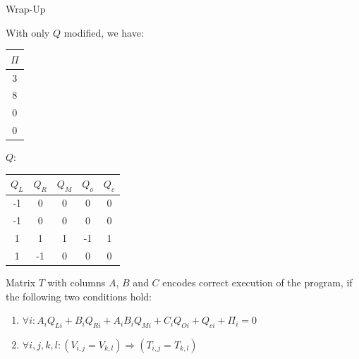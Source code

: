 \documentclass{zkdl-presentation-template}
\begin{document}
    \begin{frame}{Wrap-Up}
        \begin{example}
            With only $Q$ modified, we have:
            \centering 
            \begin{center}
                \begin{tabular}{|c|}
                    \hline
                    $\Pi$ \\ 
                    \hline
                    3 \\ 
                    \hline
                    8 \\ 
                    \hline
                    0 \\ 
                    \hline
                    0 \\ 
                    \hline
                \end{tabular} \hspace{1cm}
            $Q$: 
                \begin{tabular}{|c|c|c|c|c|}
                    \hline
                    $Q_L$ & $Q_R$ & $Q_M$ & $Q_o$ & $Q_c$ \\ 
                    \hline
                    -1 & 0 & 0 & 0 & 0 \\ 
                    \hline
                    -1 & 0 & 0 & 0 & 0 \\ 
                    \hline
                    1 & 1 & 1 & -1 & 1 \\ 
                    \hline
                    1 & -1 & 0 & 0 & 0 \\ 
                    \hline
                \end{tabular}
            \end{center}
        \end{example}

        \pause\begin{definition}
            Matrix $T$ with columns $A$, $B$ and $C$ encodes correct execution of the program, if the following two conditions hold:
            \begin{enumerate}
                \item \(\forall i: A_i Q_{Li} + B_i Q_{Ri} + A_i B_i Q_{Mi} + C_i Q_{Oi} + Q_{ci} + \Pi_i = 0\)
                \item \(\forall i, j, k, l: (V_{i,j} = V_{k,l}) \Rightarrow (T_{i,j} = T_{k,l})\)
            \end{enumerate}
        \end{definition}
    \end{frame}
\end{document}
